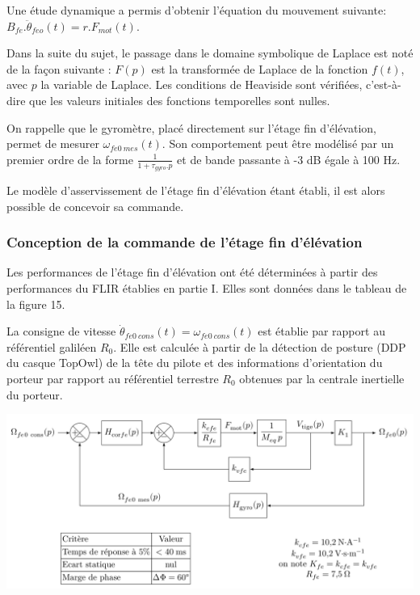 
Une étude dynamique a permis d'obtenir l'équation du mouvement suivante: $B_{fe}.\ddot\theta_{feo}(t)=r.F_{mot}(t)$.

Dans la suite du sujet, le passage dans le domaine symbolique de Laplace est noté de la façon suivante : $F(p)$ est la transformée de Laplace de la fonction $f(t)$, avec $p$ la variable de Laplace. Les conditions de Heaviside sont vérifiées, c'est-à-dire que les valeurs initiales des fonctions temporelles sont nulles.


On rappelle que le gyromètre, placé directement sur l'étage fin d'élévation, permet de mesurer $\omega_{fe0\ mes}(t)$. Son comportement peut être modélisé par un premier ordre de la forme
$\frac{1}{1+\tau_{gyro}.p}$ et de bande passante à -3 dB égale à 100 Hz.


Le modèle d'asservissement de l'étage fin d'élévation étant établi, il est alors possible de concevoir sa commande.

\subsubsection{Conception de la commande de l'étage fin d'élévation}

Les performances de l'étage fin d'élévation ont été déterminées à partir des performances du FLIR établies en partie I. Elles sont données dans le tableau de la figure 15.

La consigne de vitesse $\dot{\theta}_{fe0\ cons}(t)=\omega_{fe0\ cons}(t)$ est établie par rapport au référentiel galiléen $R_0$. Elle est calculée à partir de la détection de posture (DDP du casque TopOwl) de la tête du pilote et des informations d'orientation du porteur par rapport au référentiel terrestre $R_0$ obtenues par la centrale inertielle du porteur.

\begin{center}
\includegraphics[width=0.9\linewidth]{img/fig13}
\end{center}

